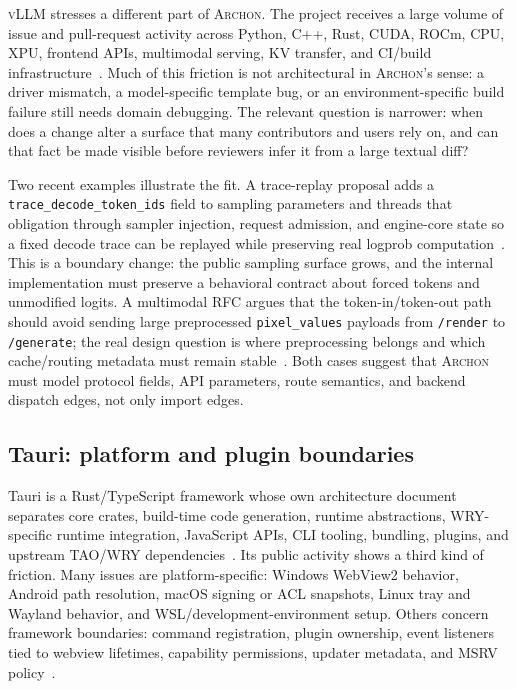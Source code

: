 \documentclass[sigconf,review,anonymous]{acmart}
\theoremstyle{plain}
\theoremstyle{definition}
\begin{document}
\textsc{vLLM} stresses a different part of \textsc{Archon}. The project receives a large
volume of issue and pull-request activity across Python, C++, Rust, CUDA, ROCm,
CPU, XPU, frontend APIs, multimodal serving, KV transfer, and CI/build
infrastructure~\cite{vllmrepo}. Much of this friction is not architectural in
\textsc{Archon}'s sense: a driver mismatch, a model-specific template bug, or an
environment-specific build failure still needs domain debugging. The relevant
question is narrower: when does a change alter a surface that many contributors
and users rely on, and can that fact be made visible before reviewers infer it
from a large textual diff?

Two recent examples illustrate the fit. A trace-replay proposal adds a
\texttt{trace\_decode\_token\_ids} field to sampling parameters and threads that
obligation through sampler injection, request admission, and engine-core state
so a fixed decode trace can be replayed while preserving real logprob
computation~\cite{vllmtracereplay}. This is a boundary change: the public
sampling surface grows, and the internal implementation must preserve a
behavioral contract about forced tokens and unmodified logits. A multimodal RFC
argues that the token-in/token-out path should avoid sending large preprocessed
\texttt{pixel\_values} payloads from \texttt{/render} to
\texttt{/generate}; the real design question is where preprocessing belongs and
which cache/routing metadata must remain stable~\cite{vllmmultimodalrfc}. Both
cases suggest that \textsc{Archon} must model protocol fields, API parameters, route
semantics, and backend dispatch edges, not only import edges.

\subsection{Tauri: platform and plugin boundaries}
\label{app:tauri}

Tauri is a Rust/TypeScript framework whose own architecture document separates
core crates, build-time code generation, runtime abstractions, WRY-specific
runtime integration, JavaScript APIs, CLI tooling, bundling, plugins, and
upstream TAO/WRY dependencies~\cite{taurirepo,tauriarchitecture}. Its public
activity shows a third kind of friction. Many issues are platform-specific:
Windows WebView2 behavior, Android path resolution, macOS signing or ACL
snapshots, Linux tray and Wayland behavior, and WSL/development-environment
setup. Others concern framework boundaries: command registration, plugin
ownership, event listeners tied to webview lifetimes, capability permissions,
updater metadata, and MSRV policy~\cite{taurieventlisteners,taurimsrv}.
\end{document}
